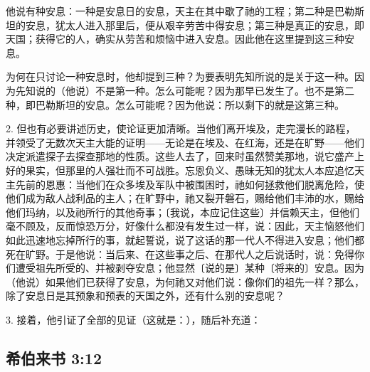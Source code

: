 他说有种安息：一种是安息日的安息，天主在其中歇了祂的工程；第二种是巴勒斯坦的安息，犹太人进入那里后，便从艰辛劳苦中得安息；第三种是真正的安息，即天国；获得它的人，确实从劳苦和烦恼中进入安息。因此他在这里提到这三种安息。\par

为何在只讨论一种安息时，他却提到三种？为要表明先知所说的是关于这一种。因为先知说的（他说）不是第一种。怎么可能呢？因为那早已发生了。也不是第二种，即巴勒斯坦的安息。怎么可能呢？因为他说：所以剩下的就是这第三种。\par

2. 但也有必要讲述历史，使论证更加清晰。当他们离开埃及，走完漫长的路程，并领受了无数次天主大能的证明——无论是在埃及、在红海，还是在旷野——他们决定派遣探子去探查那地的性质。这些人去了，回来时虽然赞美那地，说它盛产上好的果实，但那里的人强壮而不可战胜。忘恩负义、愚昧无知的犹太人本应追忆天主先前的恩惠：当他们在众多埃及军队中被围困时，祂如何拯救他们脱离危险，使他们成为敌人战利品的主人；在旷野中，祂又裂开磐石，赐给他们丰沛的水，赐给他们玛纳，以及祂所行的其他奇事；〔我说，本应记住这些〕并信赖天主，但他们毫不顾及，反而惊恐万分，好像什么都没有发生过一样，说：因此，天主恼怒他们如此迅速地忘掉所行的事，就起誓说，说了这话的那一代人不得进入安息；他们都死在旷野。于是他说：当后来、在这些事之后、在那代人之后说话时，说：免得你们遭受祖先所受的、并被剥夺安息；他显然〔说的是〕某种〔将来的〕安息。因为（他说）如果他们已获得了安息，为何祂又对他们说：像你们的祖先一样？那么，除了安息日是其预象和预表的天国之外，还有什么别的安息呢？\par

3. 接着，他引证了全部的见证（这就是：），随后补充道：\par


\subsection{希伯来书 3:12}

